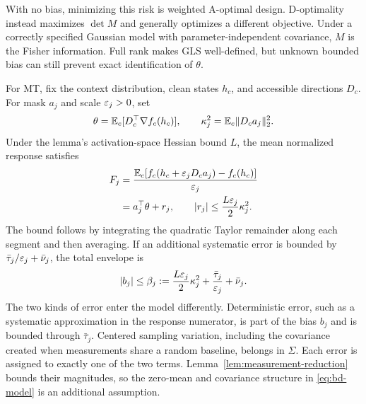 With no bias, minimizing this risk is weighted A-optimal design. D-optimality
instead maximizes $\det M$ and generally optimizes a different objective.
Under a correctly specified Gaussian model with parameter-independent covariance,
$M$ is the Fisher information. Full rank makes GLS well-defined, but unknown
bounded bias can still prevent exact identification of $\theta$.

For MT, fix the context distribution, clean states $h_c$, and accessible
directions $D_c$. For mask $a_j$ and scale $\varepsilon_j>0$, set
\begin{equation}\label{eq:bd-target}
 \theta=\mathbb{E}_c[D_c^\top\nabla f_c(h_c)],\qquad
 \kappa_j^2=\mathbb{E}_c\|D_ca_j\|_2^2.
\end{equation}
Under the lemma's activation-space Hessian bound $L$, the mean normalized
response satisfies
\begin{equation}\label{eq:bd-taylor}
 \begin{aligned}
 F_j&=\frac{\mathbb{E}_c[f_c(h_c+\varepsilon_jD_ca_j)-f_c(h_c)]}{\varepsilon_j}\\
    &=a_j^\top\theta+r_j,\qquad
 |r_j|\leq\frac{L\varepsilon_j}{2}\kappa_j^2.
 \end{aligned}
\end{equation}
The bound follows by integrating the quadratic Taylor remainder along each
segment and then averaging. If an additional systematic error is bounded by
$\bar\tau_j/\varepsilon_j+\bar\nu_j$, the total envelope is
\begin{equation}\label{eq:bd-envelope}
 |b_j|\leq\beta_j
 :=\frac{L\varepsilon_j}{2}\kappa_j^2+\frac{\bar\tau_j}{\varepsilon_j}+\bar\nu_j.
\end{equation}
The two kinds of error enter the model differently. Deterministic error, such
as a systematic approximation in the response numerator, is part of the bias
$b_j$ and is bounded through $\bar\tau_j$. Centered sampling variation,
including the covariance created when measurements share a random baseline,
belongs in $\Sigma$. Each error is assigned to exactly one of the two terms.
Lemma~\ref{lem:measurement-reduction} bounds their magnitudes, so the zero-mean
and covariance structure in \eqref{eq:bd-model} is an additional assumption.

